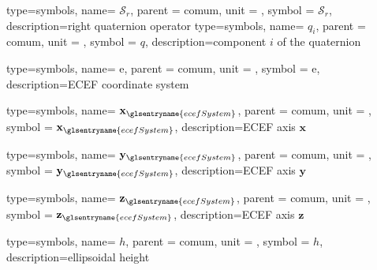 {type=symbols,
  name= \ensuremath{\boldsymbol{\mathcal{S}}_{r}},
  parent = {comum},
  unit = \unexpanded{},
  symbol = \ensuremath{\boldsymbol{\mathcal{S}}_{r}},
  description={right quaternion operator}
}
{type=symbols,
  name= \ensuremath{q_i},
  parent = {comum},
  unit = {},
  symbol = \ensuremath{q},
  description={component \ensuremath{i} of the quaternion }
}


{type=symbols,
  name= \ensuremath{\mathrm{e}},
  parent = {comum},
  unit = \unexpanded{},
  symbol = \ensuremath{\mathrm{e}},
  description={ECEF coordinate system}
}

{type=symbols,
  name= \ensuremath{\mathbf{x}_{\glsentryname{ecefSystem}}},
  parent = {comum},
  unit = \unexpanded{},
  symbol = \ensuremath{\mathbf{x}_{\glsentryname{ecefSystem}}},
  description={ECEF axis $\mathbf{x}$}
}

{type=symbols,
  name= \ensuremath{\mathbf{y}_{\glsentryname{ecefSystem}}},
  parent = {comum},
  unit = \unexpanded{},
  symbol = \ensuremath{\mathbf{y}_{\glsentryname{ecefSystem}}},
  description={ECEF axis $\mathbf{y}$}
}

{type=symbols,
  name= \ensuremath{\mathbf{z}_{\glsentryname{ecefSystem}}},
  parent = {comum},
  unit = \unexpanded{},
  symbol = \ensuremath{\mathbf{z}_{\glsentryname{ecefSystem}}},
  description={ECEF axis $\mathbf{z}$}
}


{type=symbols,
  name= \ensuremath{h},
  parent = {comum},
  unit = \unexpanded{\si{\meter}},
  symbol = \ensuremath{h},
  description={ellipsoidal height}
}